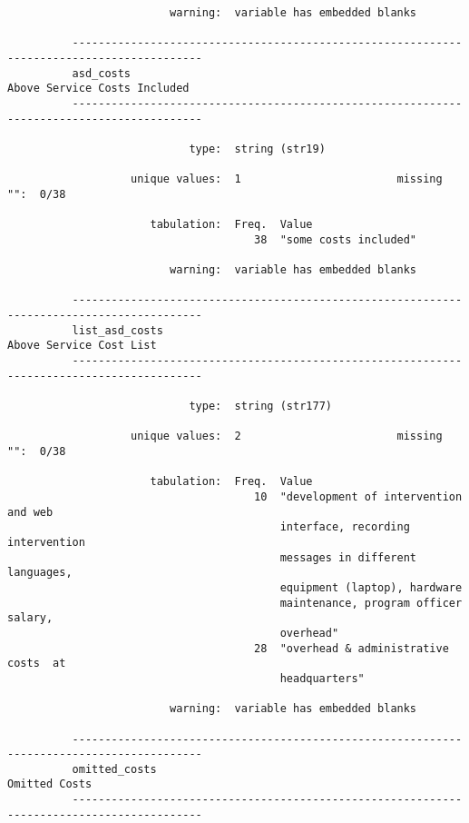 \documentclass{article}
\begin{document}
\begin{verbatim}
                         warning:  variable has embedded blanks
          
          ------------------------------------------------------------------------------------------
          asd_costs                                                     Above Service Costs Included
          ------------------------------------------------------------------------------------------
          
                            type:  string (str19)
          
                   unique values:  1                        missing "":  0/38
          
                      tabulation:  Freq.  Value
                                      38  "some costs included"
          
                         warning:  variable has embedded blanks
          
          ------------------------------------------------------------------------------------------
          list_asd_costs                                                     Above Service Cost List
          ------------------------------------------------------------------------------------------
          
                            type:  string (str177)
          
                   unique values:  2                        missing "":  0/38
          
                      tabulation:  Freq.  Value
                                      10  "development of intervention and web
                                          interface, recording intervention
                                          messages in different languages,
                                          equipment (laptop), hardware
                                          maintenance, program officer salary,
                                          overhead"
                                      28  "overhead & administrative costs  at
                                          headquarters"
          
                         warning:  variable has embedded blanks
          
          ------------------------------------------------------------------------------------------
          omitted_costs                                                                Omitted Costs
          ------------------------------------------------------------------------------------------
          

\end{verbatim}
\end{document}
